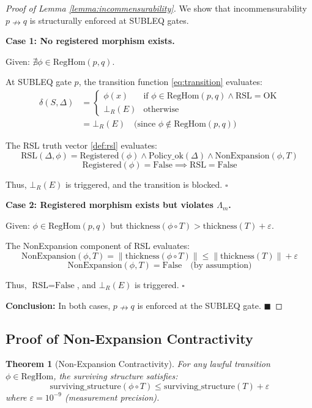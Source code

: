 \documentclass[11pt,a4paper]{article}
\newtheorem{theorem}{Theorem}[section]
\begin{document}
\begin{proof}[Proof of Lemma \ref{lemma:incommensurability}]
We show that incommensurability $p \nrightarrow q$ is structurally enforced at SUBLEQ gates.

\textbf{Case 1: No registered morphism exists.}

Given: $\nexists \phi \in \text{RegHom}(p, q)$.

At SUBLEQ gate $p$, the transition function \eqref{eq:transition} evaluates:
\begin{align}
\delta(S, \Delta) &= \begin{cases}
\phi(x) & \text{if } \phi \in \text{RegHom}(p, q) \land \text{RSL} = \text{OK} \\
\bot_R(E) & \text{otherwise}
\end{cases} \\
&= \bot_R(E) \quad \text{(since } \phi \notin \text{RegHom}(p, q)\text{)}
\end{align}

The RSL truth vector \eqref{def:rsl} evaluates:
$$\text{RSL}(\Delta, \phi) = \text{Registered}(\phi) \land \text{Policy\_ok}(\Delta) \land \text{NonExpansion}(\phi, T)$$
$$\text{Registered}(\phi) = \text{False} \implies \text{RSL} = \text{False}$$

Thus, $\bot_R(E)$ is triggered, and the transition is blocked. \hfill $\square$

\textbf{Case 2: Registered morphism exists but violates $\Lambda_m$.}

Given: $\phi \in \text{RegHom}(p, q)$ but $\text{thickness}(\phi \circ T) > \text{thickness}(T) + \varepsilon$.

The NonExpansion component of RSL evaluates:
$$\text{NonExpansion}(\phi, T) = \|\text{thickness}(\phi \circ T)\| \leq \|\text{thickness}(T)\| + \varepsilon$$
$$\text{NonExpansion}(\phi, T) = \text{False} \quad \text{(by assumption)}$$

Thus, $\text{RSL} = \text{False}$, and $\bot_R(E)$ is triggered. \hfill $\square$

\textbf{Conclusion:} In both cases, $p \nrightarrow q$ is enforced at the SUBLEQ gate. \hfill $\blacksquare$
\end{proof}

\subsection{Proof of Non-Expansion Contractivity}

\begin{theorem}[Non-Expansion Contractivity]\label{thm:contractivity}
For any lawful transition $\phi \in \text{RegHom}$, the surviving structure satisfies:
$$\text{surviving\_structure}(\phi \circ T) \leq \text{surviving\_structure}(T) + \varepsilon$$
where $\varepsilon = 10^{-9}$ (measurement precision).
\end{theorem}
\end{document}
